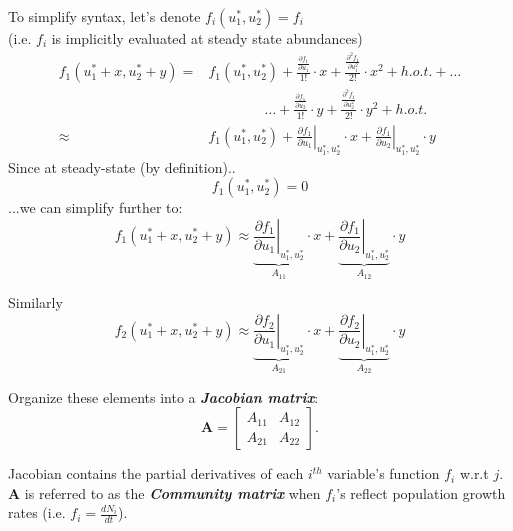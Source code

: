 \documentclass{article}
\newcommand{\ind}{\-\hspace{1cm}}
\begin{document}
To simplify syntax, let's denote $f_i(u_1^*,u_2^*) = f_i$\\
\ind (i.e. $f_i$ is implicitly evaluated at steady state abundances)
\begin{align*}
	f_1(u_1^* + x, u_2^* + y) = & f_1(u_1^*,u_2^*) + \frac{\frac{\partial f_1}{\partial u_1}}{1! } \cdot x + 
	\frac{\frac{\partial^2 f_1}{\partial u_1^2}}{2! } \cdot x^2 + h.o.t. + \dots \\
	&\quad \quad \quad \quad \dots  + \frac{\frac{\partial f_1}{\partial u_2}}{1!} \cdot y + 
	\frac{\frac{\partial^2 f_1}{\partial u_2^2}}{2!}\cdot y^2 +  h.o.t.\\
	 \approx & f_1(u_1^*, u_2^*) + \left. \frac{\partial f_1}{\partial u_1}\right|_{u_1^*, u_2^*} \cdot x + \left. \frac{\partial f_1}{\partial u_2}\right|_{u_1^*, u_2^*} \cdot y
\end{align*}
Since at steady-state (by definition)..
\begin{equation*}
	f_1(u_1^*,u_2^*)=0
\end{equation*}
...we can simplify further to:
\begin{equation*}
	f_1(u_1^* + x, u_2^* + y)\approx \underbrace{\left. \frac{\partial f_1}{\partial u_1}\right|_{u_1^*, u_2^*}}_{A_{11}} \cdot x + \underbrace{\left. \frac{\partial f_1}{\partial u_2}\right|_{u_1^*, u_2^*}}_{A_{12}} \cdot y
\end{equation*}

Similarly
\begin{equation*}
	f_2(u_1^* + x, u_2^* + y)\approx \underbrace{\left. \frac{\partial f_2}{\partial u_1}\right|_{u_1^*, u_2^*}}_{A_{21}} \cdot x + \underbrace{\left. \frac{\partial f_2}{\partial u_2}\right|_{u_1^*, u_2^*}}_{A_{22}} \cdot y
\end{equation*}

Organize these elements into a \emph{\textbf{Jacobian matrix}}:
\begin{equation*}
\mathbf{A}=
	\begin{bmatrix}
	A_{11} & A_{12}\\
	A_{21} & A_{22}
	\end{bmatrix}.
\end{equation*}

Jacobian contains the partial derivatives of each $i^{th}$ variable's function $f_i$ w.r.t $j$.\\

\textbf{A} is referred to as the \emph{\textbf{Community matrix}} when $f_i$'s reflect population growth rates (i.e. $f_i=\tfrac{dN_i}{dt}$).\\
\end{document}
